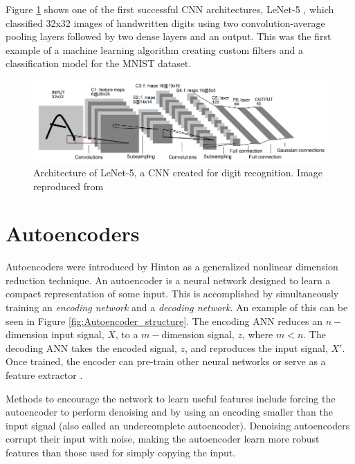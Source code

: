 Figure \ref{fig:cnn_mnist_lecun98} shows one of the first successful CNN architectures, LeNet-5 \cite{Lecun1998}, which classified 32x32 images of handwritten digits using two convolution-average pooling layers followed by two dense layers and an output. This was the first example of a machine learning algorithm creating custom filters and a classification model for the MNIST dataset.



\begin{figure}[H]
	\centering
	\includegraphics[width=0.85\linewidth]{images/cnn_mnist_lecun98}
	\caption{Architecture of LeNet-5, a CNN created for digit recognition. Image reproduced from \cite{Lecun1998}}
	\label{fig:cnn_mnist_lecun98}
\end{figure}

\section{Autoencoders} \label{Autoencoders}

Autoencoders were introduced by Hinton \cite{Hinton2006} as a generalized nonlinear dimension reduction technique. An autoencoder is a neural network designed to learn a compact representation of some input. This is accomplished by simultaneously training an \textit{encoding network} and a \textit{decoding network}. An example of this can be seen in Figure \ref{fig:Autoencoder_structure}. The encoding ANN reduces an $n-$dimension input signal, $X$, to a $m-$dimension signal, $z$, where $m < n$. The decoding ANN takes the encoded signal, $z$, and reproduces the input signal, $X'$. Once trained, the encoder can pre-train other neural networks or serve as a feature extractor \cite{Erhan2010,CHARTE2018}. 

Methods to encourage the network to learn useful features include forcing the autoencoder to perform denoising \cite{Vincent2008, Vincent2010} and by using an encoding smaller than the input signal (also called an undercomplete autoencoder). Denoising autoencoders corrupt their input with noise, making the autoencoder learn more robust features than those used for simply copying the input. 

